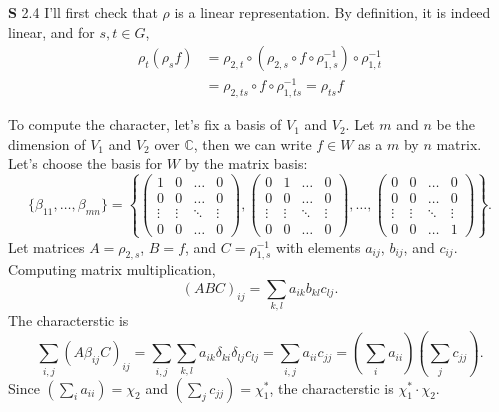 \documentclass[a4paper, 12pt]{article}
\theoremstyle{Mydefinition}
\theoremstyle{Mytheorem}
\begin{document}
\noindent \textbf{S} 2.4
I'll first check that $\rho$ is a linear representation. By definition, it is indeed linear, and for $s,t\in G$, 
\begin{equation}
    \begin{split}
        \rho_t(\rho_s f) &= \rho_{2,t}\circ \left(\rho_{2,s}\circ f\circ \rho_{1,s}^{-1}\right)\circ \rho_{1, t}^{-1} \\
        &= \rho_{2,ts}\circ f\circ \rho_{1,ts}^{-1} = \rho_{ts} f
    \end{split}
\end{equation}

To compute the character, let's fix a basis of $V_1$ and $V_2$. Let $m$ and $n$ be the dimension of $V_1$ and $V_2$ over $\mathbb{C}$, then we can write $f\in W$ as a $m$ by $n$ matrix. Let's choose the basis for $W$ by the matrix basis:
\begin{equation}
    \{\beta_{11}, \ldots, \beta_{mn}\} = \left\{\begin{pmatrix}1 & 0 & \hdots & 0\\
    0 & 0 & \hdots & 0\\
    \vdots & \vdots & \ddots & \vdots\\
    0 & 0 & \hdots & 0
    \end{pmatrix}, \begin{pmatrix}0 & 1 & \hdots & 0\\
    0 & 0 & \hdots & 0\\
    \vdots & \vdots & \ddots & \vdots\\
    0 & 0 & \hdots & 0
    \end{pmatrix}, \ldots, \begin{pmatrix}0 & 0 & \hdots & 0\\
    0 & 0 & \hdots & 0\\
    \vdots & \vdots & \ddots & \vdots\\
    0 & 0 & \hdots & 1
    \end{pmatrix}\right\}.
\end{equation}
Let matrices $A = \rho_{2,s}$, $B = f$, and $C = \rho_{1,s}^{-1}$ with elements $a_{ij}$, $b_{ij}$, and $c_{ij}$. Computing matrix multiplication,
\begin{equation}
    (ABC)_{ij} = \sum_{k,l} a_{ik}b_{kl}c_{lj}.
\end{equation}
The characterstic is
\begin{equation}
    \sum_{i,j}(A\beta_{ij}C)_{ij} = \sum_{i,j}\sum_{k,l}a_{ik}\delta_{ki}\delta_{lj}c_{lj} = \sum_{i,j}a_{ii}c_{jj} = \left(\sum_{i}a_{ii}\right)\left(\sum_{j}c_{jj}\right).
\end{equation}
Since $\left(\sum_{i}a_{ii}\right) = \chi_2$ and $\left(\sum_{j}c_{jj}\right) = \chi_1^*$, the characterstic is $\chi_1^*\cdot \chi_2$.
\end{document}
